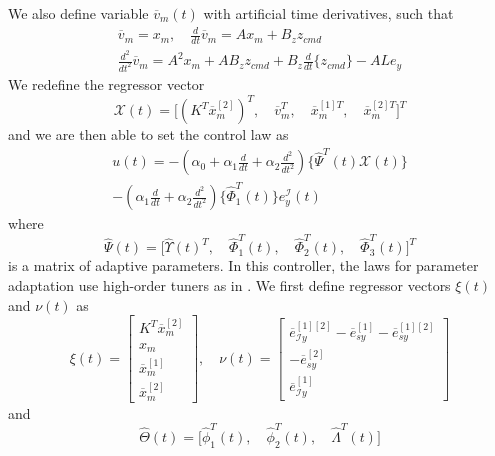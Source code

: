 \documentclass[english]{ifacconf}
\begin{document}
We also define variable $\overline{v}_m(t)$ with artificial time derivatives, such that
\begin{equation}
\begin{gathered}
	\overline{v}_m = x_m, \quad \frac{d}{dt}\overline{v}_m  = A x_m + B_z z_{cmd} \\
	\frac{d^2}{dt^2} \overline{v}_m = A^2 x_m + A B_z z_{cmd} + B_z \frac{d}{dt} \{ z_{cmd} \} - A L e_y
\end{gathered}
\end{equation}
We redefine the regressor vector
\begin{equation}
\mathcal{X}(t) = \big[ (K^T \overline{x}_m^{[2]})^T,\quad \overline{v}_m^T,\quad \overline{x}_m^{[1]T},\quad \overline{x}_m^{[2]T} \big]^T
\end{equation}
and we are then able to set the control law as
\begin{multline}
	u (t) = -(\alpha_0 + \alpha_1 \frac{d}{dt} + \alpha_2 \frac{d^2}{dt^2} ) \big \{ \hat{\Psi}^T(t) \mathcal{X}(t) \big \} \\ -  (\alpha_1 \frac{d}{dt} + \alpha_2 \frac{d^2}{dt^2}) \big \{ \hat{\Phi}_1^T(t) \big \} e_y^\mathcal{I} (t)
\end{multline}
where 
\begin{equation}
\hat{\Psi}(t) = \big[ \hat{\Upsilon}(t)^T,\quad \hat{\Phi}_1^T(t),\quad \hat{\Phi}_2^T(t),\quad \hat{\Phi}_3^T(t) \big]^T 
\end{equation}
is a matrix of adaptive parameters. In this controller, the laws for parameter adaptation use high-order tuners as in \cite{qu2016phd}. We first define regressor vectors $\xi(t)$ and $\nu(t)$ as
\begin{equation}
	\xi(t) = \begin{bmatrix}
		K^T \overline{x}_m^{[2]} \\ x_m \\ \overline{x}_m^{[1]} \\ \overline{x}_m^{[2]}
	\end{bmatrix}, \quad \nu(t) = \begin{bmatrix}
		\overline{e}_{\mathcal{I}y}^{[1][2]} - \overline{e}_{sy}^{[1]} - \overline{e}_{sy}^{[1][2]} \\ -\overline{e}_{sy}^{[2]} \\ \overline{e}_{\mathcal{I}y}^{[1]}
	\end{bmatrix}
\end{equation}
and 
\begin{equation}
\hat{\Theta}(t) = \big[ \hat{\phi}_1^T(t),\quad \hat{\phi}_2^T(t),\quad \hat{\Lambda}^T(t) \big]
\end{equation}
\end{document}
